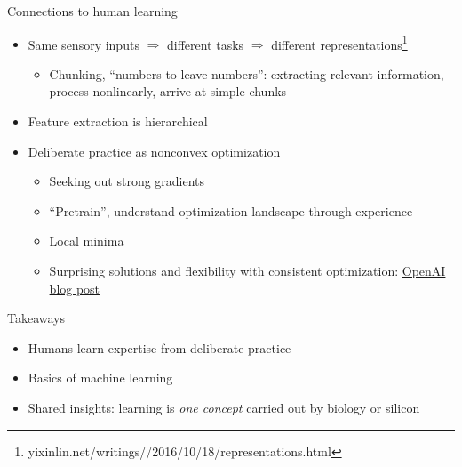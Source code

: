 \documentclass{beamer}
\begin{document}
\begin{frame}{Connections to human learning}
  \begin{itemize}
    \item Same sensory inputs $\Rightarrow$ different tasks $\Rightarrow$ different representations\footnote{yixinlin.net/writings//2016/10/18/representations.html}
      \begin{itemize}
        \item Chunking, ``numbers to leave numbers'': extracting relevant information, process nonlinearly, arrive at simple chunks
      \end{itemize}
    \item Feature extraction is hierarchical
    \item Deliberate practice as nonconvex optimization
      \begin{itemize}
        \item Seeking out strong gradients
        \item ``Pretrain'', understand optimization landscape through experience
        \item Local minima
        \item Surprising solutions and flexibility with consistent optimization: \href{https://blog.openai.com/faulty-reward-functions/}{OpenAI blog post}
      \end{itemize}
  \end{itemize}
\end{frame}

\begin{frame}{Takeaways}
  \begin{itemize}
    \item Humans learn expertise from deliberate practice
    \item Basics of machine learning
    \item Shared insights: learning is \textit{one concept} carried out by biology or silicon
  \end{itemize}
\end{frame}
\end{document}
